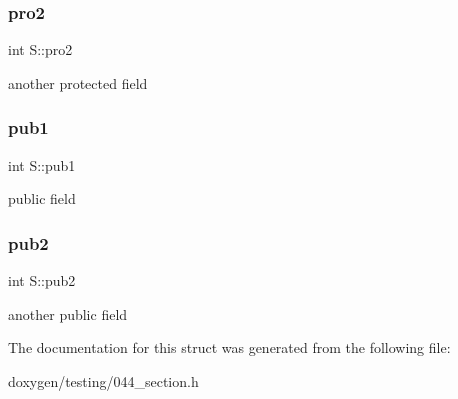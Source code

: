 \subsubsection{\texorpdfstring{pro2}{pro2}}
{\footnotesize\ttfamily int S\+::pro2\hspace{0.3cm}{\ttfamily [protected]}}

another protected field \mbox{\label{struct_s_aff6062601582dff52ace76d285c2e504}} 
\subsubsection{\texorpdfstring{pub1}{pub1}}
{\footnotesize\ttfamily int S\+::pub1}

public field \mbox{\label{struct_s_a413054db7785010db38c16322c8583cc}} 
\subsubsection{\texorpdfstring{pub2}{pub2}}
{\footnotesize\ttfamily int S\+::pub2}

another public field 

The documentation for this struct was generated from the following file\+:\begin{DoxyCompactItemize}
\item 
doxygen/testing/044\+\_\+section.\+h\end{DoxyCompactItemize}
